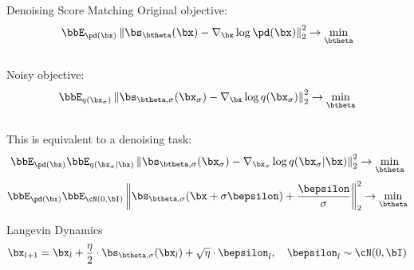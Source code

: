 \documentclass{beamer}
\begin{document}
\begin{frame}{Denoising Score Matching}
	Original objective:
	\vspace{-0.2cm}
	\[
		\bbE_{\pd(\bx)}\left\| \bs_{\btheta}(\bx) - \nabla_\bx \log \pd(\bx) \right\|_2^2 \rightarrow \min_{\btheta}
	\]
    \eqpause
	\vspace{-0.5cm} \\
	Noisy objective:
	\vspace{-0.2cm}
	\[
		\bbE_{q(\bx_{\sigma})}\left\| \bs_{\btheta, \sigma}(\bx_\sigma) - \nabla_\bx \log q(\bx_{\sigma}) \right\|_2^2 \rightarrow \min_{\btheta}
	\]
    \eqpause
	\vspace{-0.5cm} \\
	This is equivalent to a denoising task:
	\vspace{-0.2cm}
	\[
		\bbE_{\pd(\bx)} \bbE_{q(\bx_{\sigma} | \bx)}\left\| \bs_{\btheta, \sigma}(\bx_{\sigma}) - \nabla_{\bx_{\sigma}} \log q(\bx_{\sigma} | \bx) \right\|_2^2 \rightarrow \min_{\btheta}
	\]
    \eqpause
	\vspace{-0.3cm}
	\[
		\bbE_{\pd(\bx)} \bbE_{\cN(0, \bI)}\left\| \bs_{\btheta, \sigma}(\bx + \sigma \bepsilon) + \frac{\bepsilon}{\sigma} \right\|_2^2 \rightarrow \min_{\btheta}
	\]
    \eqpause
	\vspace{-0.5cm}
	\begin{block}{Langevin Dynamics}
		\vspace{-0.3cm}
		\[
			\bx_{l + 1} = \bx_l + \frac{\eta}{2} \cdot \bs_{\btheta, \sigma}(\bx_l) + \sqrt{\eta} \cdot \bepsilon_l, \quad \bepsilon_l \sim \cN(0, \bI)
		\]
		\vspace{-0.7cm}
	\end{block}
\end{frame}
\end{document}

